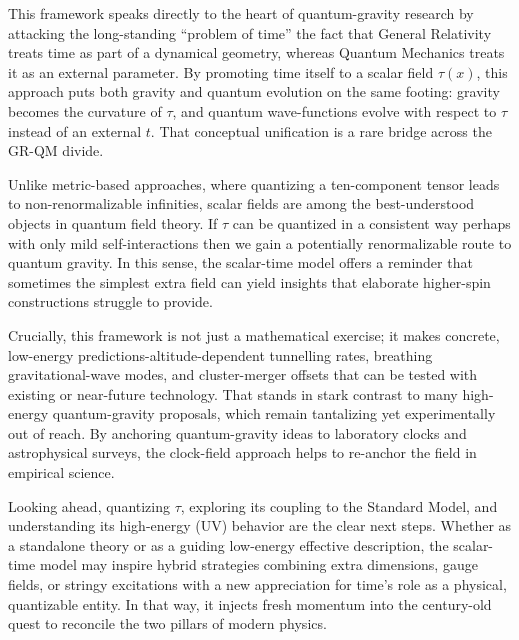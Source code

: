 This framework speaks directly to the heart of quantum-gravity research by attacking the long-standing “problem of 
time” the fact that General Relativity treats time as part of a dynamical geometry, whereas Quantum Mechanics treats 
it as an external parameter. By promoting time itself to a scalar field $\tau(x)$, this approach puts both gravity and 
quantum evolution on the same footing: gravity becomes the curvature of $\tau$, and quantum wave-functions evolve with
respect to $\tau$ instead of an external $t$. That conceptual unification is a rare bridge across the GR-QM divide.

Unlike metric-based approaches, where quantizing a ten-component tensor leads to non-renormalizable infinities,
scalar fields are among the best-understood objects in quantum field theory. If $\tau$ can be quantized in a consistent
way perhaps with only mild self-interactions then we gain a potentially renormalizable route to quantum gravity.
In this sense, the scalar-time model offers a reminder that sometimes the simplest extra field can yield insights
that elaborate higher-spin constructions struggle to provide.

Crucially, this framework is not just a mathematical exercise; it makes concrete, low-energy predictions-altitude-dependent 
tunnelling rates, breathing gravitational-wave modes, and cluster-merger offsets that can be tested with existing or near-future 
technology. That stands in stark contrast to many high-energy quantum-gravity proposals, which remain tantalizing yet 
experimentally out of reach. By anchoring quantum-gravity ideas to laboratory clocks and astrophysical surveys, the 
clock-field approach helps to re-anchor the field in empirical science.

Looking ahead, quantizing $\tau$, exploring its coupling to the Standard Model, and understanding its high-energy (UV) 
behavior are the clear next steps. Whether as a standalone theory or as a guiding low-energy effective description,
the scalar-time model may inspire hybrid strategies combining extra dimensions, gauge fields, or stringy excitations with 
a new appreciation for time's role as a physical, quantizable entity. In that way, it injects fresh momentum into the 
century-old quest to reconcile the two pillars of modern physics.